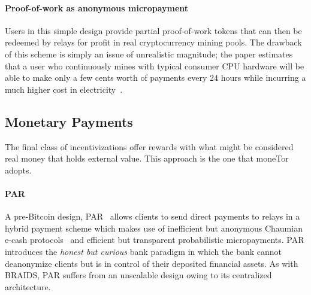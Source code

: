 
\paragraph*{Proof-of-work as anonymous micropayment} Users in this simple design
provide partial proof-of-work tokens that can then be redeemed by relays for
profit in real cryptocurrency mining pools. The drawback of this scheme is
simply an issue of unrealistic magnitude; the paper estimates that a user who
continuously mines with typical consumer CPU hardware will be able to make only
a few cents worth of payments every 24 hours while incurring a much higher cost
in electricity~\cite{biryukov2015proof}.
\subsection{Monetary Payments}
\label{sub:monetary}

The final class of incentivizations offer rewards with what might be considered
real money that holds external value. This approach is the one that moneTor adopts.

\paragraph*{PAR} A pre-Bitcoin design, PAR~\cite{androulaki2008payment}
allows clients to send direct payments to relays in a hybrid payment scheme
which makes use of inefficient but anonymous Chaumian e-cash
protocols~\cite{chaum1988untraceable} and efficient but transparent
probabilistic micropayments. PAR introduces the \emph{honest but curious} bank
paradigm in which the bank cannot deanonymize clients but is in control of their
deposited financial assets. As with BRAIDS, PAR suffers from an unscalable
design owing to its centralized architecture.

